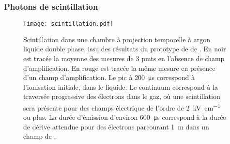       \subsubsection{Photons de scintillation}

        \begin{figure}[htbp]
          \centering
          \texttt{[image: scintillation.pdf]}
          \caption[Scintillation dans une chambre à projection temporelle à argon liquide double phase.]{\label{fig::scintillation}Scintillation dans une chambre à projection temporelle à argon liquide double phase, issu des résultats du prototype de \TOO{} de \protodp{}\cite{Aimard2018}. En noir est tracée la moyenne des mesures de 3 \glspl{pmt} en l'absence de champ d'amplification. En rouge est tracée la même mesure en présence d'un champ d'amplification. Le pic à \SI{200}{\micro\second} correspond à l'ionisation initiale, dans le liquide. Le continuum correspond à la traversée progressive des électrons dans le gaz, où une scintillation sera présente pour des champs électrique de l'ordre de \SI{2}{\kilo\volt\per\centi\meter} ou plus. La durée d'émission d'environ \SI{600}{\micro\second} correspond à la durée de dérive attendue pour des électrons parcourant \SI{1}{\meter} dans un champ de \driftfield{}.}
        \end{figure}
        
